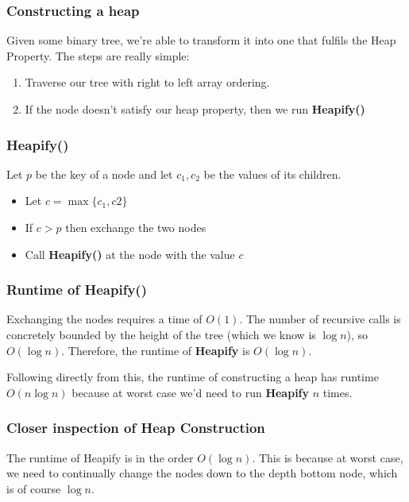 \documentclass[11pt,a4paper,titlepage,dvipsnames,cmyk]{scrartcl}
\begin{document}
\subsubsection{Constructing a heap}%
\label{ssub:Constructing a heap}
Given some binary tree, we're able to transform it into one that fulfils
the Heap Property. The steps are really simple:

\begin{enumerate}
    \item Traverse our tree with right to left array ordering.
    \item If the node doesn't satisfy our heap property, then we run
        \textbf{Heapify()} 
\end{enumerate}

\subsubsection{Heapify()}%
\label{ssub:Heapify()}
Let $p$ be the key of a node and let $c_1, c_2$ be the values of its
children.
\begin{itemize}
    \item Let $c = \max\{c_1,c2\}$
    \item If $c > p$ then exchange the two nodes
    \item Call \textbf{Heapify()} at the node with the value $c$
\end{itemize}

\subsubsection{Runtime of Heapify()}%
\label{ssub:Runtime of Heapify()}
Exchanging the nodes requires a time of $O(1)$. The number of recursive
calls is concretely bounded by the height of the tree (which we know is
$\log n$), so $O(\log n)$. Therefore, the runtime of \textbf{Heapify} is
$O(\log n)$.

Following directly from this, the runtime of constructing a heap has
runtime $O(n \log n)$ because at worst case we'd need to run
\textbf{Heapify} $n$ times.

\subsubsection{Closer inspection of Heap Construction}%
\label{ssub:Closer inspection of Heap Construction}
The runtime of Heapify is in the order $O(\log n)$. This is because at
worst case, we need to continually change the nodes down to the depth bottom
node, which is of course $\log n$.
\end{document}
